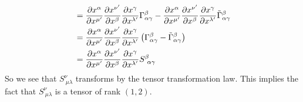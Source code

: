 \documentclass[11pt]{article}
\numberwithin{equation}{section}
\begin{document}
\begin{enumerate}[(a)]
\begin{align*}
&= \partiald{x^{\alpha}}{x^{\mu'}}\partiald{x^{\nu'}}{x^{\beta}}\partiald{x^{\gamma}}{x^{\lambda'}}\Gamma^{\beta}_{\alpha\gamma} - \partiald{x^{\alpha}}{x^{\mu'}}\partiald{x^{\nu'}}{x^{\beta}}\partiald{x^{\gamma}}{x^{\lambda'}}\tilde{\Gamma}^{\beta}_{\alpha\gamma}\\ 
&= \partiald{x^{\alpha}}{x^{\mu'}}\partiald{x^{\nu'}}{x^{\beta}}\partiald{x^{\gamma}}{x^{\lambda'}}\left(\Gamma^{\beta}_{\alpha\gamma} - \tilde{\Gamma}^{\beta}_{\alpha\gamma}\right)\\ 
&= \partiald{x^{\alpha}}{x^{\mu'}}\partiald{x^{\nu'}}{x^{\beta}}\partiald{x^{\gamma}}{x^{\lambda'}}S^{\beta}_{\ \alpha\gamma}
\end{align*}
So we see that $S^{\nu}_{\ \mu\lambda}$ transforms by the tensor transformation law. This implies the fact that $S^{\nu}_{\ \mu\lambda}$ is a tensor of rank $(1,2)$.


\end{enumerate}
\end{document}

